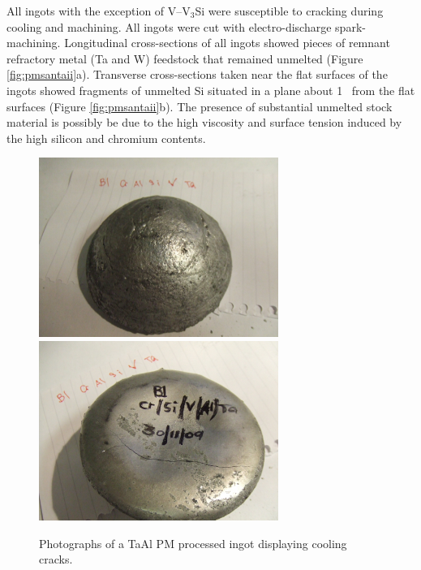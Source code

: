 All ingots with the exception of V--V$_3$Si were susceptible to cracking during cooling and machining.  All ingots were cut with electro-discharge spark-machining.  Longitudinal cross-sections of all ingots showed pieces of remnant refractory metal (Ta and W) feedstock that remained unmelted (Figure \ref{fig:pmsantaii}a).  Transverse cross-sections taken near the flat surfaces of the ingots showed fragments of unmelted Si situated in a plane about 1  \centi\metre\ from the flat surfaces (Figure \ref{fig:pmsantaii}b).  The presence of substantial unmelted stock material is possibly be due to the high viscosity and surface tension induced by the high silicon and chromium contents. 



%
\begin{figure}[H]
\begin{center}
\includegraphics[width=7.8cm]{PMsanTaAl}
\includegraphics[width=7.8cm]{PMsanTaAlii}
\caption{Photographs of a TaAl PM processed ingot displaying cooling cracks.}
\label{fig:pmsantaal}
\end{center}
\end{figure}
%
%
